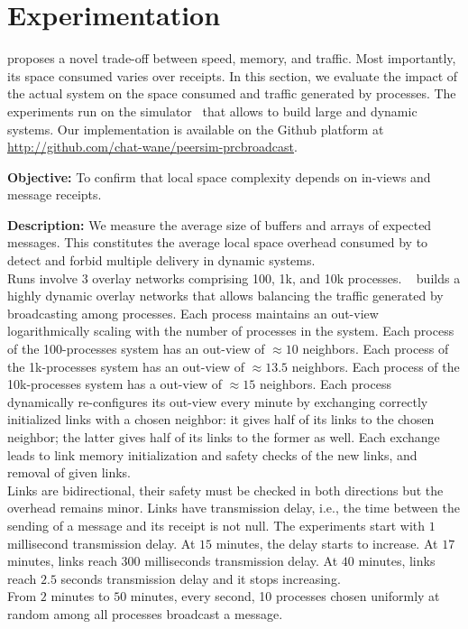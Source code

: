 
\section{Experimentation}
\label{sec:experimentation}

\RPCBROADCAST proposes a novel trade-off between speed, memory, and
traffic. Most importantly, its space consumed varies over receipts. In this
section, we evaluate the impact of the actual system on the space consumed and
traffic generated by processes. The experiments run on the \PEERSIM
simulator~\cite{montresor2009peersim} that allows to build large and dynamic
systems. Our implementation is available on the Github platform at
\url{http://github.com/chat-wane/peersim-prcbroadcast}.

\noindent \textbf{Objective:} To confirm that local space complexity
depends on in-views and message receipts.

\noindent \textbf{Description:} We measure the average size of buffers and
arrays of expected messages. This constitutes the average local space overhead
consumed by \RPCBROADCAST to detect and forbid multiple delivery in dynamic
systems.\\
Runs involve 3 overlay networks comprising 100, 1k, and 10k
processes. \SPRAY~\cite{nedelec2017adaptive} builds a highly dynamic overlay
networks that allows balancing the traffic generated by broadcasting among
processes. Each process maintains an out-view logarithmically scaling with the
number of processes in the system. Each process of the 100-processes system has
an out-view of $\approx 10$ neighbors. Each process of the 1k-processes system
has an out-view of $\approx 13.5$ neighbors. Each process of the 10k-processes
system has a out-view of $\approx 15$ neighbors. Each process dynamically
re-configures its out-view every minute by exchanging correctly initialized
links with a chosen neighbor: it gives half of its links to the chosen
neighbor; the latter gives half of its links to the former as well. Each
exchange leads to link memory initialization and safety checks of the new links,
and removal of given links.\\
Links are bidirectional, their safety must be checked in both directions but the
overhead remains minor. Links have transmission delay, i.e., the time between
the sending of a message and its receipt is not null. The experiments start with
$1$ millisecond transmission delay. At $15$ minutes, the delay starts to
increase. At $17$ minutes, links reach $300$ milliseconds transmission delay. At
$40$ minutes,
links reach $2.5$ seconds transmission delay and it stops increasing.\\
From $2$ minutes to $50$ minutes, every second, 10 processes chosen uniformly at
random among all processes broadcast a message.

